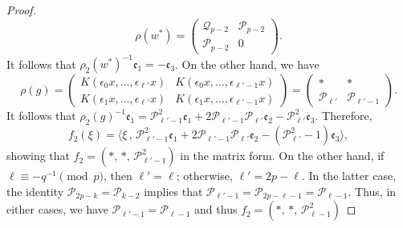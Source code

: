 \documentclass{amsart}
\def\calP{\mathcal{P}}
\def\calQ{\mathcal{Q}}
\theoremstyle{definition}
\begin{document}
\begin{proof}
    \begin{equation}
    \label{eqn.wstar}
        \rho(w^\ast) = \begin{pmatrix} \calQ_{p-2} & \calP_{p-2}\\ \calP_{p-2} & 0\end{pmatrix}.
    \end{equation}
It follows that $\rho_2(w^\ast)^{-1}\mathfrak{e}_1= - \mathfrak{e}_3$.
On the other hand, we have 
$$\rho(g)=\begin{pmatrix} K(\epsilon_0 x,\ldots,\epsilon_{\ell'} x) & K(\epsilon_0 x,\ldots,\epsilon_{\ell'-1}x) \\ K(\epsilon_1 x,\ldots,\epsilon_{\ell'} x) & K(\epsilon_1 x,\ldots,\epsilon_{\ell'-1} x)\end{pmatrix} = \begin{pmatrix}
    * & * \\
    \calP_{\ell'} & \calP_{\ell'-1}
\end{pmatrix}.$$
It follows that $\rho_2(g)^{-1} \mathfrak{e}_1 = \calP_{\ell'-1}^2 \mathfrak{e}_1 + 2 \calP_{\ell'-1} \calP_{\ell'} \mathfrak{e}_2 - \calP_{\ell'}^2 \mathfrak{e}_3$. Therefore, 
$$
f_2(\xi) = \langle \xi \, , \, \calP_{{\ell'}-1}^2 \mathfrak{e}_1 + 2\calP_{{\ell'}-1}\calP_{\ell'} \mathfrak{e}_2 - (\calP_{\ell'}^2-1) \mathfrak{e}_3 \rangle ,
$$
showing that $f_2 = (\ast, \, \ast, \, \calP_{\ell'-1}^2)$ in the matrix form.
On the other hand, if $\ell \equiv -q^{-1} \pmod{p}$, then $\ell'=\ell$; otherwise, $\ell' = 2p - \ell$. In the latter case, the identity $\calP_{2p-k} = \calP_{k-2}$ implies that $\calP_{\ell' - 1} = \calP_{2p - \ell - 1}=\calP_{\ell-1}$. Thus, in either cases, we have $\calP_{\ell'-1} = \calP_{\ell-1}$ and thus $f_2 = (\ast, \, \ast, \, \calP_{\ell-1}^2)$


\end{proof}
\end{document}
